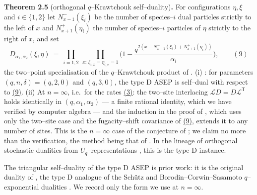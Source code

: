 \documentclass[11pt]{article}
\theoremstyle{plain}
\theoremstyle{definition}
\theoremstyle{remark}
\newcommand{\cL}{\mathcal L}\newcommand{\cO}{\mathcal O}\newcommand{\cE}{\mathcal E}
\begin{document}
\label{thm_dual}\noindent\textbf{Theorem 2.5} (orthogonal $q$--Krawtchouk self--duality)\textbf{.} 
For configurations $\eta,\xi$ and $i\in\{1,2\}$ let $N^-_{x-1}(\xi_i)$ be the number
of species--$i$ dual particles strictly to the left of $x$ and $N^+_{x+1}(\eta_i)$
the number of species--$i$ particles of $\eta$ strictly to the right of $x$, and set
\label{eq_Dreu}
\begin{equation}
  D_{\alpha_1,\alpha_2}(\xi,\eta)\ =\ \prod_{i=1,2}\ \prod_{x:\,\xi_{i,x}=\eta_{i,x}=1}
  \Big(1-\frac{q^{2\left(x-N^-_{x-1}(\xi_i)+N^+_{x+1}(\eta_i)\right)}}{\alpha_i}\Big),\qquad(9)
\end{equation}
the two--point specialisation of the $q$--Krawtchouk product of
\cite[Thm.~3.1]{REU}.
\textup{(i)} \cite[Thm.~3.1]{REU}: for parameters $(q,n,\delta)=(q,2,0)$ and
$(q,3,0)$, the type D ASEP is self--dual with respect to \hyperref[eq_Dreu]{(9)}.
\textup{(ii)} At $n=\infty$, i.e.\ for the rates \hyperref[eq_rates]{(3)}: the two--site
interlacing $\cL D=D\cL^{\mathsf T}$ holds identically in $(q,\alpha_1,\alpha_2)$ ---
a finite rational identity, which we have verified by computer algebra --- and the
induction in the proof of \cite[Thm.~3.1, eqs.~(16)--(19)]{REU}, which uses only the
two--site case and the fugacity--shift covariance of \hyperref[eq_Dreu]{(9)}, extends it to
any number of sites. This is the $n=\infty$ case of the conjecture of
\cite[Rmk.~4]{REU}; we claim no more than the verification, the method being that of
\cite{REU}. In the lineage of orthogonal stochastic dualities from
$U_q$--representations \cite{Groenevelt,CGRS}, this is the type D instance.
\par

The triangular self--duality of the type D ASEP is prior work: it is the original
duality of \cite{KLLPZ}, the type D analogue of the Sch\"utz and
Borodin--Corwin--Sasamoto $q$--exponential dualities \cite{SchutzDual,BCS}. We record
only the form we use at $n=\infty$.
\end{document}
